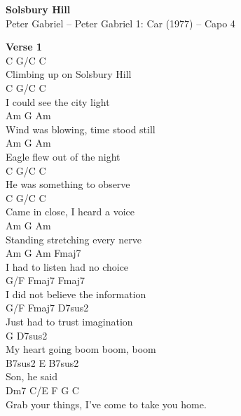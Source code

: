 \documentclass[a4paper]{article}
\begin{document}
    \begin{center}
        \textbf{Solsbury Hill}
        ~\\
        Peter Gabriel -- Peter Gabriel 1: Car (1977)
         -- Capo 4
    \end{center}
    {
        \scriptsize
        \textbf{Verse 1}
        ~\\
        {
            \cutive
            \obeyspaces
C  G/C  C
\\
           Climbing up on Solsbury Hill
\\
C  G/C  C
\\
           I could see the city light
\\
Am  G  Am
\\
           Wind was blowing, time stood still
\\
Am  G  Am
\\
           Eagle flew out of the night
\\
C  G/C  C
\\
           He was something to observe
\\
C  G/C  C
\\
           Came in close, I heard a voice
\\
Am  G  Am
\\
           Standing stretching every nerve
\\
Am  G  Am                       Fmaj7
\\
           I had to listen had no choice
\\
G/F       Fmaj7             Fmaj7 
\\
I did not believe the information
\\
G/F         Fmaj7           D7sus2
\\
Just had to trust imagination
\\
G        D7sus2
\\
My heart going boom boom, boom
\\
B7sus2 E       B7sus2
\\
Son,    he said
\\
Dm7       C/E         F       G        C     
\\
Grab your things, I've come to take you home.
\\

}}
\end{document}
